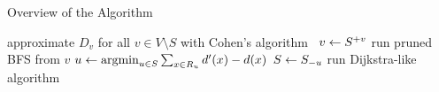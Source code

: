 \begin{algorithm}
\caption{Overview of the \growshrink Algorithm}
\label{algo:grow-shrink}
\begin{algorithmic}[1]
\Repeat
\State approximate $D_v$ for all $v \in V \setminus S$ with Cohen's algorithm~\cite{DBLP:journals/jcss/Cohen97}
\label{line:ghc-ls-grow-1}
\State$v \gets S^{+v}$
\State run pruned BFS from $v$
\label{line:ghc-ls-grow-2}
\State$u \gets \operatorname*{argmin}_{u \in S} \sum_{x \in R_u}d'(x) - d(x)$
\label{line:ghc-ls-shrink-1}
\State$S \gets S_{-u}$
\State run Dijkstra-like algorithm
\label{line:ghc-ls-shrink-2}
\end{algorithmic}
\end{algorithm}

